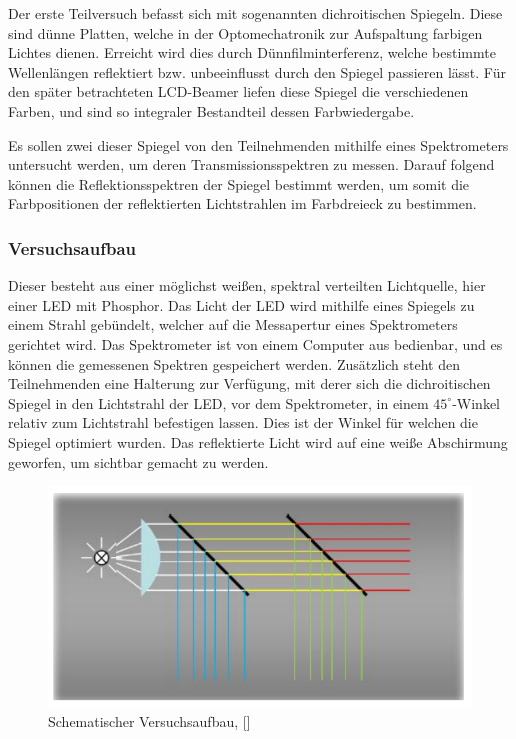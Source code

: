 
Der erste Teilversuch befasst sich mit sogenannten dichroitischen Spiegeln. Diese sind dünne Platten, welche in der Optomechatronik zur Aufspaltung farbigen Lichtes dienen. Erreicht wird dies durch Dünnfilminterferenz, welche bestimmte Wellenlängen reflektiert bzw. unbeeinflusst durch den Spiegel passieren lässt. Für den später betrachteten LCD-Beamer liefen diese Spiegel die verschiedenen Farben, und sind so integraler Bestandteil dessen Farbwiedergabe.

Es sollen zwei dieser Spiegel von den Teilnehmenden mithilfe eines Spektrometers untersucht werden, um deren Transmissionsspektren zu messen. Darauf folgend können die Reflektionsspektren der Spiegel bestimmt werden, um somit die Farbpositionen der reflektierten Lichtstrahlen im Farbdreieck zu bestimmen.

\subsubsection{Versuchsaufbau} Dieser besteht aus einer möglichst weißen, spektral verteilten Lichtquelle, hier einer LED mit Phosphor. Das Licht der LED wird mithilfe eines Spiegels zu einem Strahl gebündelt, welcher auf die Messapertur eines Spektrometers gerichtet wird. Das Spektrometer ist von einem Computer aus bedienbar, und es können die gemessenen Spektren gespeichert werden. Zusätzlich steht den Teilnehmenden eine Halterung zur Verfügung, mit derer sich die dichroitischen Spiegel in den Lichtstrahl der LED, vor dem Spektrometer, in einem $45^\circ$-Winkel relativ zum Lichtstrahl befestigen lassen. Dies ist der Winkel für welchen die Spiegel optimiert wurden. Das reflektierte Licht wird auf eine weiße Abschirmung geworfen, um sichtbar gemacht zu werden.

\begin{figure}[h]
	\centering
	\includegraphics[scale=0.4]{Images/Aufbau.png}
	\caption{Schematischer Versuchsaufbau, [\cite[Abb. 3.2]{AML_SKRIPT}]}
\end{figure}


